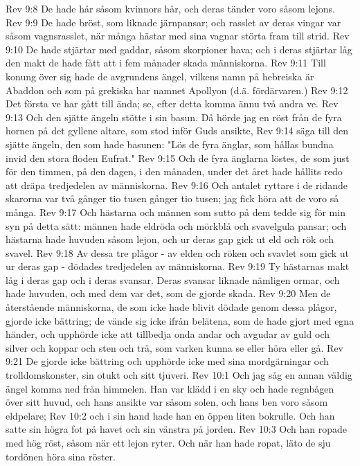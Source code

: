 Rev 9:8  De hade hår såsom kvinnors hår, och deras tänder voro såsom lejons.
Rev 9:9  De hade bröst, som liknade järnpansar; och rasslet av deras vingar var såsom vagnsrasslet, när många hästar med sina vagnar störta fram till strid.
Rev 9:10  De hade stjärtar med gaddar, såsom skorpioner hava; och i deras stjärtar låg den makt de hade fått att i fem månader skada människorna.
Rev 9:11  Till konung över sig hade de avgrundens ängel, vilkens namn på hebreiska är Abaddon och som på grekiska har namnet Apollyon (d.ä. fördärvaren.)
Rev 9:12  Det första ve har gått till ända; se, efter detta komma ännu två andra ve.
Rev 9:13  Och den sjätte ängeln stötte i sin basun. Då hörde jag en röst från de fyra hornen på det gyllene altare, som stod inför Guds ansikte,
Rev 9:14  säga till den sjätte ängeln, den som hade basunen: "Lös de fyra änglar, som hållas bundna invid den stora floden Eufrat."
Rev 9:15  Och de fyra änglarna löstes, de som just för den timmen, på den dagen, i den månaden, under det året hade hållits redo att dräpa tredjedelen av människorna.
Rev 9:16  Och antalet ryttare i de ridande skarorna var två gånger tio tusen gånger tio tusen; jag fick höra att de voro så många.
Rev 9:17  Och hästarna och männen som sutto på dem tedde sig för min syn på detta sätt: männen hade eldröda och mörkblå och svavelgula pansar; och hästarna hade huvuden såsom lejon, och ur deras gap gick ut eld och rök och svavel.
Rev 9:18  Av dessa tre plågor - av elden och röken och svavlet som gick ut ur deras gap - dödades tredjedelen av människorna.
Rev 9:19  Ty hästarnas makt låg i deras gap och i deras svansar. Deras svansar liknade nämligen ormar, och hade huvuden, och med dem var det, som de gjorde skada.
Rev 9:20  Men de återstående människorna, de som icke hade blivit dödade genom dessa plågor, gjorde icke bättring; de vände sig icke ifrån belätena, som de hade gjort med egna händer, och upphörde icke att tillbedja onda andar och avgudar av guld och silver och koppar och sten och trä, som varken kunna se eller höra eller gå.
Rev 9:21  De gjorde icke bättring och upphörde icke med sina mordgärningar och trolldomskonster, sin otukt och sitt tjuveri.
Rev 10:1  Och jag såg en annan väldig ängel komma ned från himmelen. Han var klädd i en sky och hade regnbågen över sitt huvud, och hans ansikte var såsom solen, och hans ben voro såsom eldpelare;
Rev 10:2  och i sin hand hade han en öppen liten bokrulle. Och han satte sin högra fot på havet och sin vänstra på jorden.
Rev 10:3  Och han ropade med hög röst, såsom när ett lejon ryter. Och när han hade ropat, läto de sju tordönen höra sina röster.
